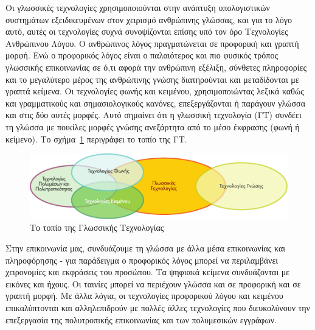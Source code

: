 \clearpage



\begin{multicols}{2}

Οι γλωσσικές τεχνολογίες χρησιμοποιούνται στην ανάπτυξη υπολογιστικών συστημάτων εξειδικευμένων στον χειρισμό ανθρώπινης γλώσσας, και για το λόγο αυτό, αυτές οι τεχνολογίες συχνά συνοψίζονται επίσης υπό τον όρο Τεχνολογίες Ανθρώπινου Λόγου. Ο  ανθρώπινος λόγος πραγματώνεται σε προφορική και γραπτή μορφή. Ενώ ο προφορικός λόγος είναι ο παλαιότερος και πιο φυσικός τρόπος γλωσσικής επικοινωνίας σε ό,τι αφορά την ανθρώπινη εξέλιξη, σύνθετες πληροφορίες και το μεγαλύτερο μέρος της ανθρώπινης γνώσης διατηρούνται και μεταδίδονται με γραπτά κείμενα. Οι τεχνολογίες φωνής και κειμένου, χρησιμοποιώντας λεξικά καθώς και γραμματικούς και σημασιολογικούς κανόνες, επεξεργάζονται ή παράγουν γλώσσα και στις δύο αυτές μορφές. Αυτό σημαίνει ότι η γλωσσική τεχνολογία (ΓΤ) συνδέει τη γλώσσα με ποικίλες μορφές γνώσης ανεξάρτητα από το μέσο έκφρασης (φωνή ή κείμενο). Το σχήμα~\ref{fig:ltincontext_de} περιγράφει το τοπίο της ΓΤ.

\begin{figure}[htb]
  \center
  \includegraphics[width=\textwidth]{../_media/greek/language_technologies}
  \caption{Το τοπίο της Γλωσσικής Τεχνολογίας}
  \label{fig:ltincontext_de}
\end{figure}

Στην επικοινωνία μας, συνδυάζουμε τη γλώσσα με άλλα μέσα επικοινωνίας και πληροφόρησης - για παράδειγμα ο προφορικός λόγος μπορεί να περιλαμβάνει χειρονομίες και εκφράσεις του προσώπου. Τα ψηφιακά κείμενα συνδυάζονται με εικόνες και ήχους. Οι ταινίες μπορεί να περιέχουν γλώσσα και σε προφορική και σε γραπτή μορφή. Με άλλα λόγια, οι τεχνολογίες προφορικού λόγου και κειμένου επικαλύπτονται και αλληλεπιδρούν με πολλές άλλες τεχνολογίες που διευκολύνουν την επεξεργασία της πολυτροπικής επικοινωνίας και των πολυμεσικών εγγράφων. 


\end{multicols}
